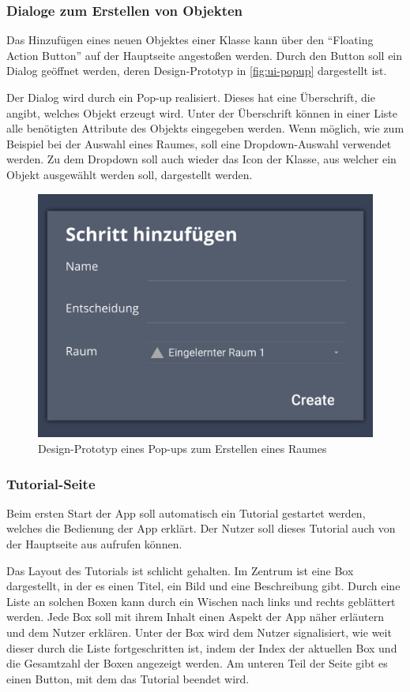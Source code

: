 \subsubsection{Dialoge zum Erstellen von Objekten} \label{sec:app-dialog}

Das Hinzufügen eines neuen Objektes einer Klasse kann über den \enquote{Floating Action Button} auf der Hauptseite angestoßen werden.
Durch den Button soll ein Dialog geöffnet werden, deren Design-Prototyp in \autoref{fig:ui-popup} dargestellt ist.

Der Dialog wird durch ein Pop-up realisiert.
Dieses hat eine Überschrift, die angibt, welches Objekt erzeugt wird.
Unter der Überschrift können in einer Liste alle benötigten Attribute des Objekts eingegeben werden.
Wenn möglich, wie zum Beispiel bei der Auswahl eines Raumes, soll eine Dropdown-Auswahl verwendet werden.
Zu dem Dropdown soll auch wieder das Icon der Klasse, aus welcher ein Objekt ausgewählt werden soll, dargestellt werden.

\begin{figure}[h!tbp]
	\includegraphics[width=.5\textwidth]{images/ui-prototype/popup.png}
	\centering
	\caption{Design-Prototyp eines Pop-ups zum Erstellen eines Raumes}
	\label{fig:ui-popup}
\end{figure}

\subsubsection{Tutorial-Seite} \label{sec:app-tutorial}

Beim ersten Start der App soll automatisch ein Tutorial gestartet werden, welches die Bedienung der App erklärt.
Der Nutzer soll dieses Tutorial auch von der Hauptseite aus aufrufen können.

Das Layout des Tutorials ist schlicht gehalten.
Im Zentrum ist eine Box dargestellt, in der es einen Titel, ein Bild und eine Beschreibung gibt.
Durch eine Liste an solchen Boxen kann durch ein Wischen nach links und rechts geblättert werden.
Jede Box soll mit ihrem Inhalt einen Aspekt der App näher erläutern und dem Nutzer erklären.
Unter der Box wird dem Nutzer signalisiert, wie weit dieser durch die Liste fortgeschritten ist,
indem der Index der aktuellen Box und die Gesamtzahl der Boxen angezeigt werden.
Am unteren Teil der Seite gibt es einen Button, mit dem das Tutorial beendet wird.

